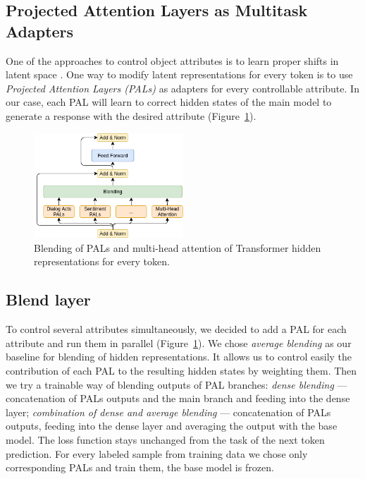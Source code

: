 \documentclass[11pt]{article}
\begin{document}
\subsection{Projected Attention Layers as Multitask Adapters}
One of the approaches to control object attributes is to learn proper shifts in latent space \cite{hu2021controllable}. One way to modify latent representations for every token is to use \textit{Projected Attention Layers (PALs)} \cite{stickland2019bert} as adapters for every controllable attribute. In our case, each PAL will learn to correct hidden states of the main model to generate a response with the desired attribute (Figure~\ref{adding_pals_dialogpt}).
\begin{figure}[ht!]
    \centering
    \includegraphics[width=0.5\textwidth]{img/pals_model.png}
    \caption{Blending of PALs and multi-head attention of Transformer hidden representations for every token.}
    \label{adding_pals_dialogpt}
\end{figure}

\subsection{Blend layer}
To control several attributes simultaneously, we decided to add a PAL for each attribute and run them in parallel (Figure~\ref{adding_pals_dialogpt}). 
We chose \textit{average blending} as our baseline for blending of hidden representations. It allows us to  control easily the contribution of each PAL to the resulting hidden states by  weighting them. Then we try a trainable way of blending outputs of PAL branches: \textit{dense blending} --- concatenation of PALs outputs and the main branch and feeding into the dense layer; \textit{combination of dense and average blending} --- concatenation of PALs outputs, feeding into the dense layer and averaging the output with the base model.
The loss function stays unchanged from the task of the next token prediction. For every labeled sample from training data we chose only corresponding PALs and train them, the base model is frozen. %
\end{document}
